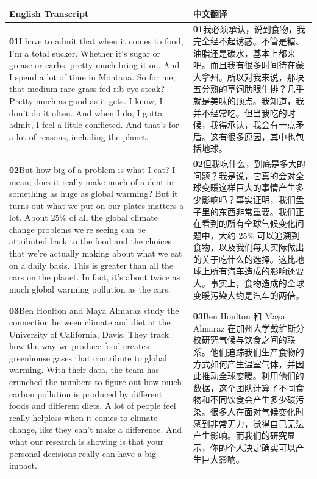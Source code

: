 \documentclass[UTF8,zihao=-4,fontset=fandol]{ctexart}
\newcommand{\TranscriptColumn}{\raggedright\arraybackslash\hyphenpenalty=10000\exhyphenpenalty=10000\sloppy}
\begin{document}
\renewcommand{\arraystretch}{1.23}
\begin{longtable}{>{\TranscriptColumn}p{} >{\TranscriptColumn}p{}}
\rowcolor{headerBg}\textbf{English Transcript} & \textbf{中文翻译} \\ \hline
\textbf{01}\quad I have to admit that when it comes to food, I'm a total sucker. Whether it's sugar or grease or carbs, pretty much bring it on. And I spend a lot of time in Montana. So for me, that medium-rare grass-fed rib-eye steak? Pretty much as good as it gets. I know, I don't do it often. And when I do, I gotta admit, I feel a little conflicted. And that's for a lot of reasons, including the planet. & \textbf{01}\quad 我必须承认，说到食物，我完全经不起诱惑。不管是糖、油脂还是碳水，基本上都来吧。而且我有很多时间待在蒙大拿州。所以对我来说，那块五分熟的草饲肋眼牛排？几乎就是美味的顶点。我知道，我并不经常吃。但当我吃的时候，我得承认，我会有一点矛盾。这有很多原因，其中也包括地球。 \\ \hline
\textbf{02}\quad But how big of a problem is what I eat? I mean, does it really make much of a dent in something as huge as global warming? But it turns out what we put on our plates matters a lot. About 25\% of all the global climate change problems we're seeing can be attributed back to the food and the choices that we're actually making about what we eat on a daily basis. This is greater than all the cars on the planet. In fact, it's about twice as much global warming pollution as the cars. & \textbf{02}\quad 但我吃什么，到底是多大的问题？我是说，它真的会对全球变暖这样巨大的事情产生多少影响吗？事实证明，我们盘子里的东西非常重要。我们正在看到的所有全球气候变化问题中，大约 25\% 可以追溯到食物，以及我们每天实际做出的关于吃什么的选择。这比地球上所有汽车造成的影响还要大。事实上，食物造成的全球变暖污染大约是汽车的两倍。 \\ \hline
\textbf{03}\quad Ben Houlton and Maya Almaraz study the connection between climate and diet at the University of California, Davis. They track how the way we produce food creates greenhouse gases that contribute to global warming. With their data, the team has crunched the numbers to figure out how much carbon pollution is produced by different foods and different diets. A lot of people feel really helpless when it comes to climate change, like they can't make a difference. And what our research is showing is that your personal decisions really can have a big impact. & \textbf{03}\quad Ben Houlton 和 Maya Almaraz 在加州大学戴维斯分校研究气候与饮食之间的联系。他们追踪我们生产食物的方式如何产生温室气体，并因此推动全球变暖。利用他们的数据，这个团队计算了不同食物和不同饮食会产生多少碳污染。很多人在面对气候变化时感到非常无力，觉得自己无法产生影响。而我们的研究显示，你的个人决定确实可以产生巨大影响。 \\ \hline

\end{longtable}
\end{document}
